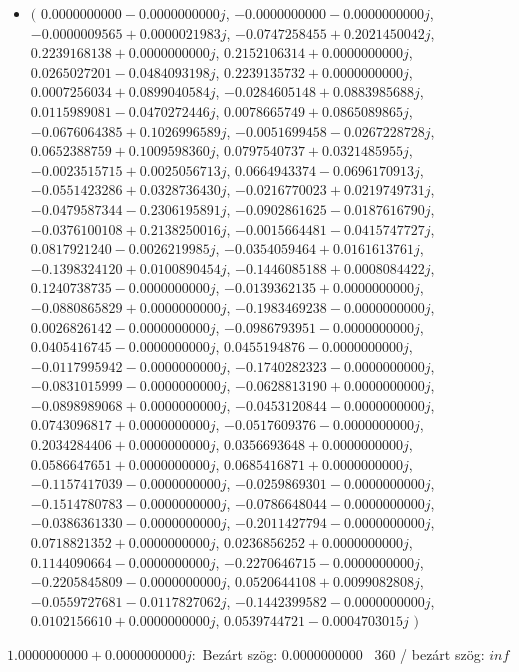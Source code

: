 \documentclass[14pt,a4paper]{article}
\begin{document}
\begin{itemize}
\item
$\big($
$0.0000000000-0.0000000000j$, $-0.0000000000-0.0000000000j$, $-0.0000009565+0.0000021983j$, $-0.0747258455+0.2021450042j$, $0.2239168138+0.0000000000j$, $0.2152106314+0.0000000000j$, $0.0265027201-0.0484093198j$, $0.2239135732+0.0000000000j$, $0.0007256034+0.0899040584j$, $-0.0284605148+0.0883985688j$, $0.0115989081-0.0470272446j$, $0.0078665749+0.0865089865j$, $-0.0676064385+0.1026996589j$, $-0.0051699458-0.0267228728j$, $0.0652388759+0.1009598360j$, $0.0797540737+0.0321485955j$, $-0.0023515715+0.0025056713j$, $0.0664943374-0.0696170913j$, $-0.0551423286+0.0328736430j$, $-0.0216770023+0.0219749731j$, $-0.0479587344-0.2306195891j$, $-0.0902861625-0.0187616790j$, $-0.0376100108+0.2138250016j$, $-0.0015664481-0.0415747727j$, $0.0817921240-0.0026219985j$, $-0.0354059464+0.0161613761j$, $-0.1398324120+0.0100890454j$, $-0.1446085188+0.0008084422j$, $0.1240738735-0.0000000000j$, $-0.0139362135+0.0000000000j$, $-0.0880865829+0.0000000000j$, $-0.1983469238-0.0000000000j$, $0.0026826142-0.0000000000j$, $-0.0986793951-0.0000000000j$, $0.0405416745-0.0000000000j$, $0.0455194876-0.0000000000j$, $-0.0117995942-0.0000000000j$, $-0.1740282323-0.0000000000j$, $-0.0831015999-0.0000000000j$, $-0.0628813190+0.0000000000j$, $-0.0898989068+0.0000000000j$, $-0.0453120844-0.0000000000j$, $0.0743096817+0.0000000000j$, $-0.0517609376-0.0000000000j$, $0.2034284406+0.0000000000j$, $0.0356693648+0.0000000000j$, $0.0586647651+0.0000000000j$, $0.0685416871+0.0000000000j$, $-0.1157417039-0.0000000000j$, $-0.0259869301-0.0000000000j$, $-0.1514780783-0.0000000000j$, $-0.0786648044-0.0000000000j$, $-0.0386361330-0.0000000000j$, $-0.2011427794-0.0000000000j$, $0.0718821352+0.0000000000j$, $0.0236856252+0.0000000000j$, $0.1144090664-0.0000000000j$, $-0.2270646715-0.0000000000j$, $-0.2205845809-0.0000000000j$, $0.0520644108+0.0099082808j$, $-0.0559727681-0.0117827062j$, $-0.1442399582-0.0000000000j$, $0.0102156610+0.0000000000j$, $0.0539744721-0.0004703015j$
$\big)$
\end{itemize}
$1.0000000000+0.0000000000j$:\
Bezárt szög: $0.0000000000$ \
360 / bezárt szög: $inf$\
\end{document}
